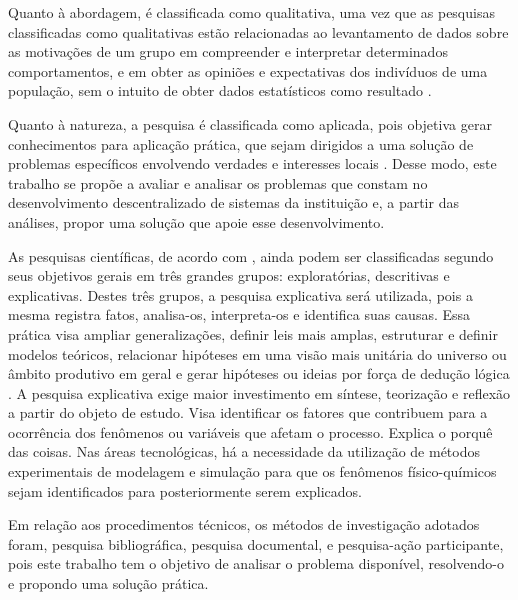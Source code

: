 Quanto à abordagem, é classificada como qualitativa, uma vez que as pesquisas
classificadas como qualitativas estão relacionadas ao levantamento de dados sobre as motivações de um grupo em compreender e interpretar determinados comportamentos, e em obter as opiniões e expectativas dos indivíduos de uma população, sem o intuito de obter dados estatísticos como resultado  \cite{gunther2006pesquisa,moresi2003metodologia}.

Quanto à natureza, a pesquisa é classificada como aplicada, pois objetiva gerar conhecimentos para aplicação prática, que sejam dirigidos a uma solução de problemas específicos envolvendo verdades e interesses locais \cite{gil2002}. Desse modo, este trabalho se propõe a avaliar e analisar os problemas que constam no desenvolvimento descentralizado de sistemas da instituição e, a partir das análises, propor uma solução que apoie esse desenvolvimento.

As pesquisas científicas, de acordo com , ainda podem ser classificadas segundo seus objetivos gerais em três grandes grupos: exploratórias, descritivas e explicativas. Destes três grupos, a pesquisa explicativa será utilizada, pois a mesma registra fatos, analisa-os, interpreta-os e identifica suas causas. Essa prática visa ampliar generalizações, definir leis mais amplas, estruturar e definir modelos teóricos, relacionar hipóteses em uma visão mais unitária do universo ou âmbito produtivo em geral e gerar hipóteses ou ideias por força de dedução lógica \cite{lakatos1991metodologia}. A pesquisa explicativa exige maior investimento em síntese, teorização e reflexão a partir do objeto de estudo. Visa identificar os fatores que contribuem para a ocorrência dos fenômenos ou variáveis que afetam o processo. Explica o porquê das coisas. Nas áreas tecnológicas, há a necessidade da utilização de métodos experimentais de modelagem e simulação para que os fenômenos físico-químicos sejam identificados para posteriormente serem explicados.

Em relação aos procedimentos técnicos, os métodos de investigação adotados foram, pesquisa bibliográfica, pesquisa documental, e pesquisa-ação participante, pois este trabalho tem o objetivo de analisar o problema disponível, resolvendo-o e propondo uma solução prática.

